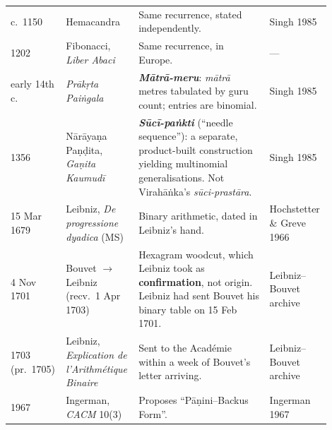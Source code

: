 \documentclass[11pt,letterpaper]{article}
\newcommand{\skt}[1]{\textit{#1}}
\theoremstyle{plain}
\theoremstyle{remark}
\begin{document}
{\begin{longtable}{@{}p{0.12\linewidth}p{0.21\linewidth}p{0.40\linewidth}p{0.17\linewidth}@{}}
c.\ 1150 & Hemacandra & Same recurrence, stated independently. & Singh 1985\\
1202 & Fibonacci, \skt{Liber Abaci} & Same recurrence, in Europe. & ---\\
early 14th c. & \skt{Prākṛta Paiṅgala} & \textbf{\skt{Mātrā-meru}}: \skt{mātrā} metres tabulated by guru count; entries are binomial. & Singh 1985\\
1356 & Nārāyaṇa Paṇḍita, \skt{Gaṇita Kaumudī} & \textbf{\skt{Sūcī-paṅkti}} (``needle sequence''): a separate, product-built construction yielding multinomial generalisations. Not Virahāṅka's \skt{sūci-prastāra}. & Singh 1985\\
15 Mar 1679 & Leibniz, \skt{De progressione dyadica} (MS) & Binary arithmetic, dated in Leibniz's hand. & Hochstetter \& Greve 1966\\
4 Nov 1701 & Bouvet $\to$ Leibniz (recv.\ 1 Apr 1703) & Hexagram woodcut, which Leibniz took as \textbf{confirmation}, not origin. Leibniz had sent Bouvet his binary table on 15 Feb 1701. & Leibniz--Bouvet archive\\
1703 (pr.\ 1705) & Leibniz, \skt{Explication de l'Arithmétique Binaire} & Sent to the Académie within a week of Bouvet's letter arriving. & Leibniz--Bouvet archive\\
1967 & Ingerman, \skt{CACM} 10(3) & Proposes ``Pāṇini--Backus Form''. & Ingerman 1967\\
\end{longtable}
}
\end{document}
